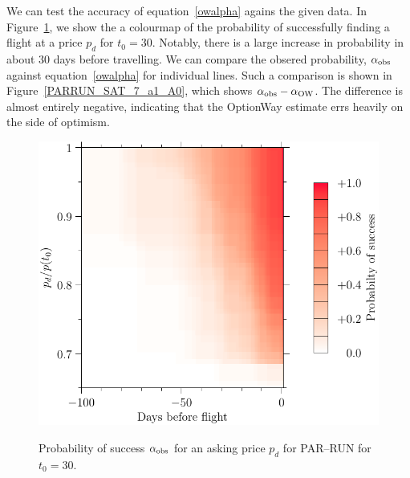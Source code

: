 \documentclass{article}
\begin{document}
We can test the accuracy of equation~\eqref{owalpha} agains the given
data.  In Figure~\ref{PARRUN_SAT_7_a0}, we show the a colourmap of the
probability of successfully finding a flight at a price $p_d$ for
$t_0=30$.  Notably, there is a large increase in probability in about
30 days before travelling.  We can compare the obsered probability,
$\alpha_{\rm{obs}}$ against equation~\eqref{owalpha} for individual
lines.  Such a comparison is shown in Figure~\ref{PARRUN_SAT_7_a1_A0},
which shows $\alpha_{\rm{obs}}-\alpha_{\rm{OW}}$.  The difference is
almost entirely negative, indicating that the OptionWay estimate errs
heavily on the side of optimism.  
\begin{figure}
  \begin{center}
    \includegraphics{pdf/PARRUN_SAT_7_a0}
    \label{PARRUN_SAT_7_a0}
    \caption{Probability of success $\alpha_{\rm{obs}}$ for an asking
      price $p_d$ for PAR--RUN for $t_0=30$.}
  \end{center}
\end{figure}
\end{document}
